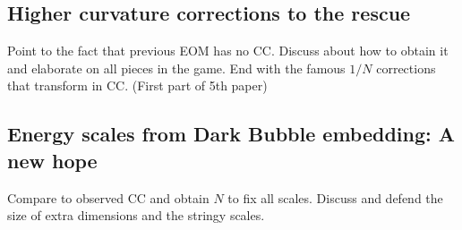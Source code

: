 \subsection{Higher curvature corrections to the rescue}
Point to the fact that previous EOM has no CC. Discuss about how to obtain it and elaborate on all pieces in the game. End with the famous $1/N$ corrections that transform in CC. (First part of 5th paper)
\subsection{Energy scales from Dark Bubble embedding: A new hope}\label{subsec: energy_scale}
Compare to observed CC and obtain $N$ to fix all scales. Discuss and defend the size of extra dimensions and the stringy scales.